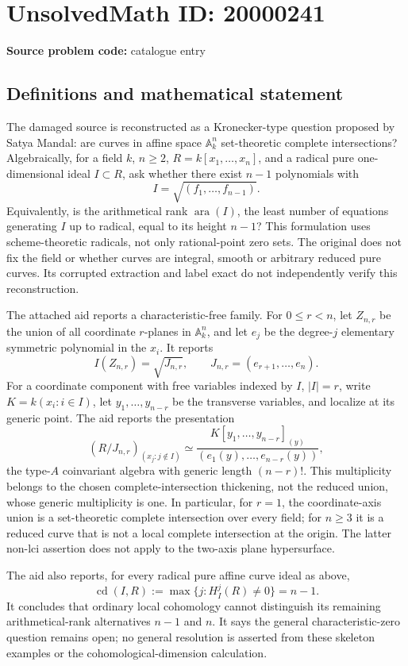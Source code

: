 \documentclass[11pt]{article}
\newcommand{\A}{\mathbb{A}}
\begin{document}
\section*{UnsolvedMath ID: 20000241}
\textbf{Source problem code:} catalogue entry
\subsection{Definitions and mathematical statement}
The damaged source is reconstructed as a Kronecker-type question proposed by Satya Mandal: are curves in affine space \(\A^n_k\) set-theoretic complete intersections? Algebraically, for a field \(k\), \(n\geq2\), \(R=k[x_1,\ldots,x_n]\), and a radical pure one-dimensional ideal \(I\subset R\), ask whether there exist \(n-1\) polynomials with
\[
I=\sqrt{(f_1,\ldots,f_{n-1})}.
\]
Equivalently, is the arithmetical rank \(\operatorname{ara}(I)\), the least number of equations generating \(I\) up to radical, equal to its height \(n-1\)? This formulation uses scheme-theoretic radicals, not only rational-point zero sets. The original does not fix the field or whether curves are integral, smooth or arbitrary reduced pure curves. Its corrupted extraction and label exact do not independently verify this reconstruction.

The attached aid reports a characteristic-free family. For \(0\leq r<n\), let \(Z_{n,r}\) be the union of all coordinate \(r\)-planes in \(\A^n_k\), and let \(e_j\) be the degree-\(j\) elementary symmetric polynomial in the \(x_i\). It reports
\[
I(Z_{n,r})=\sqrt{J_{n,r}},\qquad
J_{n,r}=(e_{r+1},\ldots,e_n).
\]
For a coordinate component with free variables indexed by \(I\), \(|I|=r\), write \(K=k(x_i:i\in I)\), let \(y_1,\ldots,y_{n-r}\) be the transverse variables, and localize at its generic point. The aid reports the presentation
\[
(R/J_{n,r})_{(x_j:j\notin I)}
\simeq
\frac{K[y_1,\ldots,y_{n-r}]_{(y)}}{(e_1(y),\ldots,e_{n-r}(y))},
\]
the type-\(A\) coinvariant algebra with generic length \((n-r)!\). This multiplicity belongs to the chosen complete-intersection thickening, not the reduced union, whose generic multiplicity is one. In particular, for \(r=1\), the coordinate-axis union is a set-theoretic complete intersection over every field; for \(n\geq3\) it is a reduced curve that is not a local complete intersection at the origin. The latter non-lci assertion does not apply to the two-axis plane hypersurface.

The aid also reports, for every radical pure affine curve ideal as above,
\[
\operatorname{cd}(I,R):=\max\{j:H_I^j(R)\ne0\}=n-1.
\]
It concludes that ordinary local cohomology cannot distinguish its remaining arithmetical-rank alternatives \(n-1\) and \(n\). It says the general characteristic-zero question remains open; no general resolution is asserted from these skeleton examples or the cohomological-dimension calculation.
\end{document}
